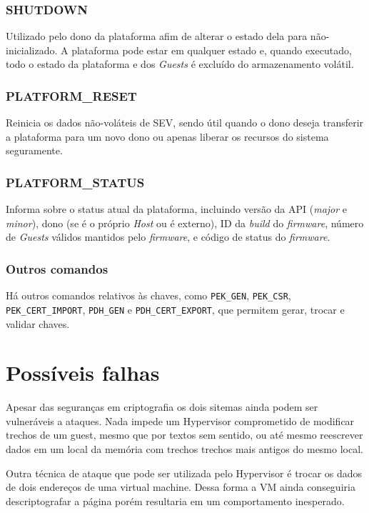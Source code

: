 \documentclass{report}
\begin{document}
\subsubsection{SHUTDOWN}

Utilizado pelo dono da plataforma afim de alterar o estado dela para
não-inicializado. A plataforma pode estar em qualquer estado e, quando
executado, todo o estado da plataforma e dos \textit{Guests} é excluído do
armazenamento volátil.

\subsubsection{PLATFORM\_RESET}

Reinicia os dados não-voláteis de SEV, sendo útil quando o dono deseja
transferir a plataforma para um novo dono ou apenas liberar os recursos do
sistema seguramente.

\subsubsection{PLATFORM\_STATUS}

Informa sobre o status atual da plataforma, incluindo versão da API
(\textit{major} e \textit{minor}), dono (se é o próprio \textit{Host} ou é
externo), ID da \textit{build} do \textit{firmware}, número de \textit{Guests}
válidos mantidos pelo \textit{firmware}, e código de status do
\textit{firmware}.

\subsubsection{Outros comandos}

Há outros comandos relativos às chaves, como \texttt{PEK\_GEN},
\texttt{PEK\_CSR}, \texttt{PEK\_CERT\_IMPORT}, \texttt{PDH\_GEN} e
\texttt{PDH\_CERT\_EXPORT}, que permitem gerar, trocar e validar chaves.

\section{Possíveis falhas}

Apesar das seguranças em criptografia os dois sitemas ainda podem ser
vulneráveis a ataques. Nada impede um Hypervisor comprometido de modificar
trechos de um guest, mesmo que por textos sem sentido, ou até mesmo reescrever
dados em um local da memória com trechos trechos mais antigos do mesmo local.

Outra técnica de ataque que pode ser utilizada pelo Hypervisor é trocar os
dados de dois endereços de uma virtual machine. Dessa forma a VM ainda
conseguiria descriptografar a página porém resultaria em um comportamento
inesperado.


\nocite{*}

\end{document}

